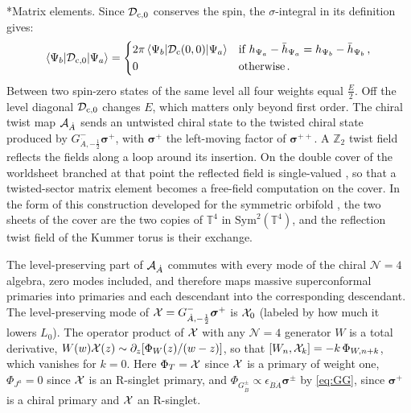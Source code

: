 \documentclass[aps,onecolumn,groupedaddress,nofootinbib,pra]{revtex4-2}
\makeatletter
\renewcommand\paragraph{\@startsection{paragraph}{4}{\parindent}{\z@}{-1em}{\normalfont\normalsize\bfseries}}
\newcommand{\Sym}{\mathrm{Sym}}
\newcommand{\Tf}{\mathbb T^4}
\newcommand{\Def}{\mathcal D}
\newcommand{\cMat}{{\rm c}}
\newcommand{\twist}{{\boldsymbol\sigma}}
\newcommand{\Dc}{\Def_{\cMat}}
\newcommand{\Dcz}{\Def_{\cMat,0}}
\makeatother
\begin{document}
\paragraph*{Matrix elements.}
Since $\Dcz$ conserves the spin, the $\sigma$-integral in its definition gives:
\begin{equation}
\label{eq:psiprimeDpsi}
\langle\Psi_b|\Dcz|\Psi_a\rangle= \left\{ \begin{aligned} & 2\pi\,\langle\Psi_b|\Dc(0,0)|\Psi_a\rangle && \text{if } h_{\Psi_a}-\bar{h}_{\Psi_a} = h_{\Psi_b}-\bar{h}_{\Psi_b}\,, \\
&0 && \text{otherwise}\,.
\end{aligned} \right.
\end{equation}
Between two spin-zero states of the same level all four weights equal $\frac E2$. Off the level diagonal $\Dcz$ changes $E$, which matters only beyond first order. The chiral twist map ${\cal A}_{\dot A}$ sends an untwisted chiral state to the twisted chiral state produced by $G^{-}_{\dot A,-\frac12}\twist^{+}$, with $\twist^{+}$ the left-moving factor of $\twist^{++}$. A $\mathbb Z_2$ twist field reflects the fields along a loop around its insertion. On the double cover of the worldsheet branched at that point the reflected field is single-valued \cite{Dixon:1986qv}, so that a twisted-sector matrix element becomes a free-field computation on the cover. In the form of this construction developed for the symmetric orbifold \cite{Lunin:2001pw,Avery:2010er,Guo:2019ady}, the two sheets of the cover are the two copies of $\Tf$ in $\Sym^2(\Tf)$, and the reflection twist field of the Kummer torus is their exchange.

The level-preserving part of ${\cal A}_{\dot A}$ commutes with every mode of the chiral $\mathcal N=4$ algebra, zero modes included, and therefore maps massive superconformal primaries into primaries and each descendant into the corresponding descendant. The level-preserving mode of ${\cal X}=G^-_{\dot A,-\frac12}\twist^+$ is ${\cal X}_0$ (labeled by how much it lowers $L_0$). The operator product of ${\cal X}$ with any $\mathcal N=4$ generator $W$ is a total derivative, $W(w){\cal X}(z)\sim\partial_z[\Phi_W(z)/(w-z)]$, so that $[W_n,{\cal X}_k]=-k\,\Phi_{W,n+k}$, which vanishes for $k=0$. Here $\Phi_T={\cal X}$ since ${\cal X}$ is a primary of weight one, $\Phi_{J^a}=0$ since ${\cal X}$ is an R-singlet primary, and $\Phi_{G^\pm_{\dot B}}\propto\epsilon_{\dot B\dot A}\twist^\pm$ by \eqref{eq:GG}, since $\twist^+$ is a chiral primary and ${\cal X}$ an R-singlet.
\end{document}
